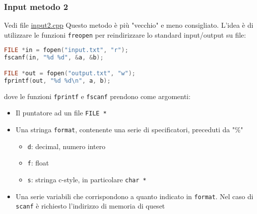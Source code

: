 \subsubsection{Input metodo 2}
Vedi file \href{run:./files/teoria/input/}{input2.cpp}
\vskip3mm
Questo metodo è più "vecchio" e meno consigliato. L'idea è di utilizzare le funzioni \verb|freopen| per reindirizzare lo standard input/output su file:
\begin{lstlisting}[language = cpp, frame = none]
FILE *in = fopen("input.txt", "r");
fscanf(in, "%d %d", &a, &b);

FILE *out = fopen("output.txt", "w");
fprintf(out, "%d %d\n", a, b);
\end{lstlisting}
dove le funzioni \verb|fprintf| e \verb|fscanf| prendono come argomenti:
\begin{itemize}
	\item Il puntatore ad un file \verb|FILE *|
	\item Una stringa \verb|format|, contenente una serie di specificatori, preceduti da "{\ttfamily \%}"
	      \begin{itemize}
		      \item \verb|d|: decimal, numero intero
		      \item \verb|f|: float
		      \item \verb|s|: stringa c-style, in particolare \verb|char *|
	      \end{itemize}
	\item Una serie variabili che corrispondono a quanto indicato in \verb|format|. Nel caso di \verb|scanf| è richiesto l'indirizzo di memoria di queset
\end{itemize}

